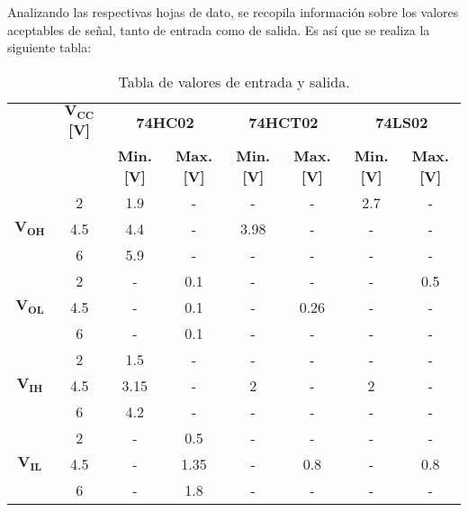 Analizando las respectivas hojas de dato, se recopila información sobre los  valores aceptables de señal, tanto de entrada como de salida. Es así que se realiza la siguiente tabla:
\begin{table}[H]
\centering
\begin{tabular}{c|c|c|c|c|c|c|c|}
\cline{2-8}
                               & $\mathbf{V_{CC}}$ \textbf{[V]} & \multicolumn{2}{c|}{\textbf{74HC02}}  & \multicolumn{2}{c|}{\textbf{74HCT02}} & \multicolumn{2}{c|}{\textbf{74LS02}} \\ \cline{3-8} 
                               &              & \textbf{Min. [V]} & \textbf{Max. [V]} & \textbf{Min. [V]} & \textbf{Max. [V]} & \textbf{Min. [V]} & \textbf{Max. [V]}	\\ \hline
\multicolumn{1}{|c|}{}         & 2            & 1.9           & -            & -             & -            & 2.7          & -            \\  
\multicolumn{1}{|c|}{$\mathbf{V_{OH}}$} & 4.5          & 4.4           & -            & 3.98          & -            & -            & -            \\  
\multicolumn{1}{|c|}{}         & 6            & 5.9           & -            & -             & -            & -            & -            \\ \hline
\multicolumn{1}{|c|}{}         & 2            & -             & 0.1          & -             & -            & -            & 0.5          \\
\multicolumn{1}{|c|}{$\mathbf{V_{OL}}$} & 4.5          & -             & 0.1          & -             & 0.26         & -            & -            \\
\multicolumn{1}{|c|}{}         & 6            & -             & 0.1          & -             & -            & -            & -            \\ \hline
\multicolumn{1}{|c|}{}         & 2            & 1.5           & -            & -             & -            & -            & -            \\ 
\multicolumn{1}{|c|}{$\mathbf{V_{IH}}$}  & 4.5          & 3.15          & -            & 2             & -            & 2            & -            \\ 
\multicolumn{1}{|c|}{}         & 6            & 4.2           & -            & -             & -            & -            & -            \\ \hline
\multicolumn{1}{|c|}{}         & 2            & -             & 0.5          & -             & -            & -            & -            \\ 
\multicolumn{1}{|c|}{$\mathbf{V_{IL}}$} & 4.5          & -             & 1.35         & -             & 0.8          & -            & 0.8          \\ 
\multicolumn{1}{|c|}{}         & 6            & -             & 1.8          & -             & -            & -            & -            \\ \hline
\end{tabular}
\centering
\caption{Tabla de valores de entrada y salida.}
\label{tabla:vinout}
\end{table}

